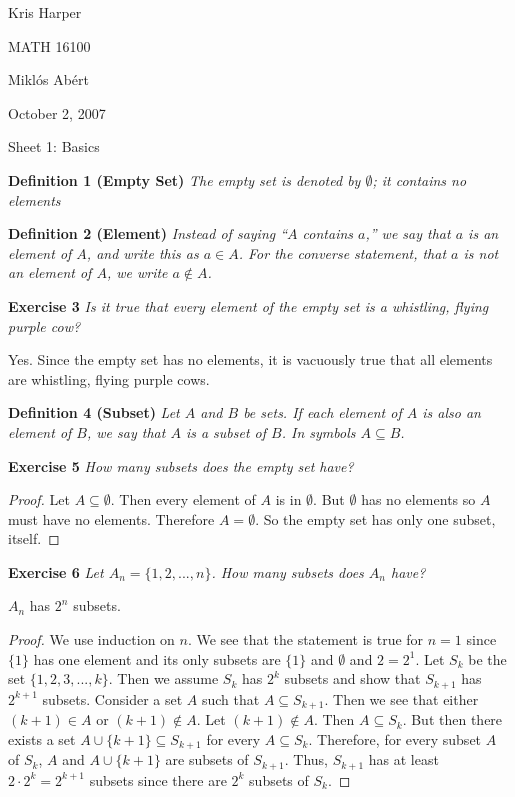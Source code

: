\documentclass{article}
\begin{document}
\begin{flushright}
Kris Harper

MATH 16100

Mikl\'{o}s Ab\'{e}rt

October 2, 2007
\end{flushright}

\begin{flushleft}

\Large

Sheet 1: Basics\newline

\normalsize

\textbf{Definition 1 (Empty Set)}
\textsl{The empty set is denoted by $\emptyset$; it contains no elements}\newline

\textbf{Definition 2 (Element)}
\textsl{Instead of saying ``$A$ contains $a$,'' we say that $a$ is an element of $A$, and write this as $a \in A$. For the converse statement, that $a$ is not an element of $A$, we write $a \notin A$.}\newline

\textbf{Exercise 3}
\textsl{Is it true that every element of the empty set is a whistling, flying purple cow?}\newline

Yes. Since the empty set has no elements, it is vacuously true that all elements are whistling, flying purple cows.\newline

\textbf{Definition 4 (Subset)}
\textsl{Let $A$ and $B$ be sets. If each element of $A$ is also an element of $B$, we say that $A$ is a subset of $B$. In symbols $A \subseteq B$.}\newline

\textbf{Exercise 5}
\textsl{How many subsets does the empty set have?}
\begin{proof}
Let $A \subseteq \emptyset$. Then every element of $A$ is in $\emptyset$. But $\emptyset$ has no elements so $A$ must have no elements. Therefore $A = \emptyset$. So the empty set has only one subset, itself.
\end{proof}

\textbf{Exercise 6}
\textsl{Let $A_n=\{1,2,...,n\}$. How many subsets does $A_n$ have?}\newline

$A_n$ has $2^n$ subsets.
\begin{proof}
We use induction on $n$. We see that the statement is true for $n=1$ since $\{1\}$ has one element and its only subsets are $\{1\}$ and $\emptyset$ and $2=2^1$. Let $S_k$ be the set $\{1,2,3,...,k\}$. Then we assume $S_k$ has $2^k$ subsets and show that $S_{k+1}$ has $2^{k+1}$ subsets. Consider a set $A$ such that $A \subseteq S_{k+1}$. Then we see that either $(k+1) \in A$ or $(k+1) \notin A$. Let $(k+1) \notin A$. Then $A \subseteq S_k$. But then there exists a set $A \cup \{k+1\} \subseteq S_{k+1}$ for every $A \subseteq S_k$. Therefore, for every subset $A$ of $S_k$, $A$ and $A \cup \{k+1\}$ are subsets of $S_{k+1}$. Thus, $S_{k+1}$ has at least $2 \cdot 2^k=2^{k+1}$ subsets since there are $2^k$ subsets of $S_k$.\newline


\end{proof}
\end{flushleft}
\end{document}
